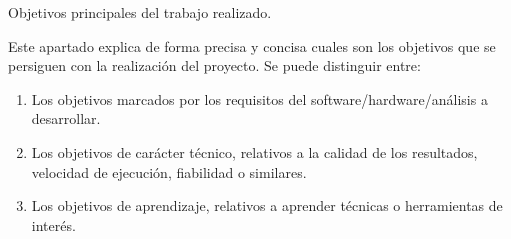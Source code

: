 
Objetivos principales del trabajo realizado.

Este apartado explica de forma precisa y concisa cuales son los objetivos que se persiguen con la realización del proyecto. Se puede distinguir entre:
\begin{enumerate}
    \item Los objetivos marcados por los requisitos del software/hardware/análisis a desarrollar.
    \item Los objetivos de carácter técnico, relativos a la calidad de los resultados, velocidad de ejecución, fiabilidad o similares.
    \item Los objetivos de aprendizaje, relativos a aprender técnicas o herramientas de interés. 
\end{enumerate}








